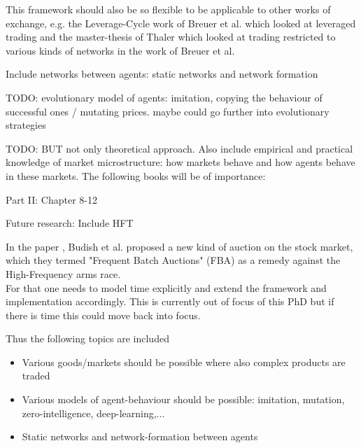 \documentclass{article}
\begin{document}
\bigskip

This framework should also be so flexible to be applicable to other works of exchange, e.g. the Leverage-Cycle work of Breuer et al. which looked at leveraged trading and the master-thesis of Thaler which looked at trading restricted to various kinds of networks in the work of Breuer et al.

\bigskip

Include networks between agents: static networks and network formation

\bigskip

TODO:  evolutionary model of agents: imitation, copying the behaviour of successful ones / mutating prices. maybe could go further into evolutionary strategies

\bigskip

TODO: BUT not only theoretical approach. Also include empirical and practical knowledge of market microstructure: how markets behave and how agents behave in these markets. The following books will be of importance: \cite{LehalleLaruelle2013}

\cite{baker_market_2013} Part II: Chapter 8-12

\bigskip

Future research: Include HFT


In the paper \cite{Budish2015}, Budish et al. proposed a new kind of auction on the stock market, which they termed "Frequent Batch Auctions" (FBA) as a remedy against the High-Frequency arms race. 
\\
For that one needs to model time explicitly and extend the framework and implementation accordingly. This is currently out of focus of this PhD but if there is time this could move back into focus.

\cite{aldridge_high_frequency_2009}

Thus the following topics are included

\begin{itemize}
\item Various goods/markets should be possible where also complex products are traded
\item Various models of agent-behaviour should be possible: imitation, mutation, zero-intelligence, deep-learning,... 
\item Static networks and network-formation between agents
\end{itemize}

\end{document}
